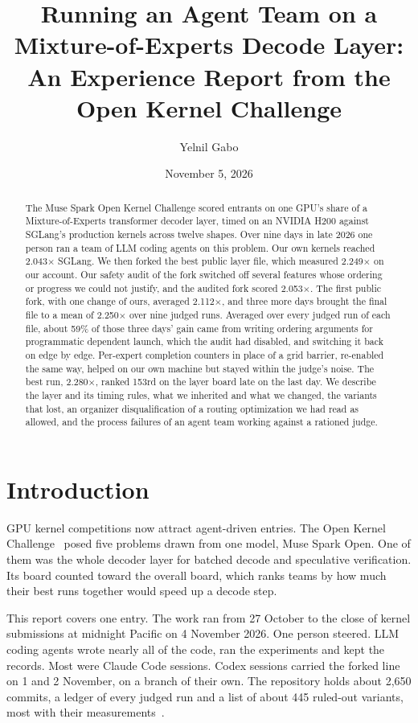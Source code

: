 \documentclass[11pt]{article}
\title{Running an Agent Team on a Mixture-of-Experts Decode Layer:\\
An Experience Report from the Open Kernel Challenge}
\author{Yelnil Gabo}
\date{November 5, 2026}
\begin{document}
\maketitle

\begin{abstract}
The Muse Spark Open Kernel Challenge scored entrants on one GPU's share of a
Mixture-of-Experts transformer decoder layer, timed on an NVIDIA H200 against
SGLang's production kernels across twelve shapes. Over nine days in late 2026 one
person ran a team of LLM coding agents on this problem. Our own kernels reached
2.043$\times$ SGLang. We then forked the best public layer file, which measured
2.249$\times$ on our account. Our safety audit of the fork switched off several
features whose ordering or progress we could not justify, and the audited fork
scored 2.053$\times$. The first public fork, with one change of ours, averaged
2.112$\times$, and three more days brought the final file to a mean of
2.250$\times$ over nine judged runs. Averaged over every judged run of each file,
about 59\% of those three days' gain came from writing ordering arguments for
programmatic dependent launch, which the audit had disabled, and switching it back
on edge by edge. Per-expert completion counters in place of a grid barrier, re-enabled the
same way, helped on our own machine but stayed within the judge's noise. The best run,
2.280$\times$, ranked 153rd on the layer board late on the last day. We
describe the layer and its timing rules, what we inherited and what we changed,
the variants that lost, an organizer disqualification of a routing optimization
we had read as allowed, and the process failures of an agent team working
against a rationed judge.
\end{abstract}

\section{Introduction}

GPU kernel competitions now attract agent-driven entries. The Open Kernel
Challenge~\cite{okc} posed five problems drawn from one model, Muse Spark Open.
One of them was the whole decoder layer for batched decode and speculative
verification. Its board counted toward the overall board, which ranks teams by
how much their best runs together would speed up a decode step.

This report covers one entry. The work ran from 27 October to the close of kernel
submissions at midnight Pacific on 4 November 2026. One person steered. LLM
coding agents wrote nearly all of the code, ran the experiments and kept the
records. Most were Claude Code sessions. Codex sessions carried the forked line on
1 and 2 November, on a branch of their own. The repository holds about 2{,}650
commits, a ledger of every judged run and a list of about 445 ruled-out variants,
most with their measurements~\cite{repo}.
\end{document}
